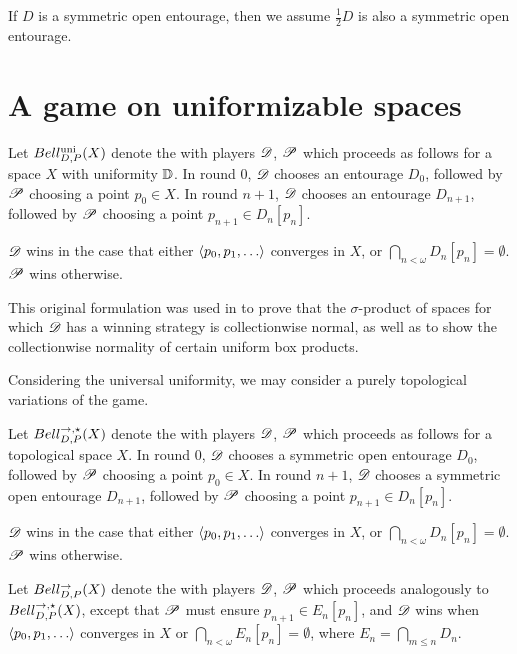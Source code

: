 If $D$ is a symmetric open entourage, then we assume $\frac{1}{2}D$ is
also a symmetric open entourage.

\section{A game on uniformizable spaces}

\begin{game}
  Let $Bell_{D,P}^{\textrm{uni}}(X)$ denote the  with players
  $\mathscr{D}$, $\mathscr{P}$ which
  proceeds as follows for a space $X$ with uniformity $\mathbb{D}$. In round $0$,
  $\mathscr{D}$ chooses an entourage $D_0$, followed by $\mathscr{P}$ choosing a point
  $p_0\in X$. In round $n+1$, $\mathscr{D}$ chooses an entourage $D_{n+1}$, followed
  by $\mathscr{P}$ choosing a point $p_{n+1}\in D_n[p_n]$.

  $\mathscr{D}$ wins in the case that either $\<p_0,p_1,\dots\>$ converges in $X$,
  or $\bigcap_{n<\omega}D_n[p_n] = \emptyset$. $\mathscr{P}$ wins otherwise.
\end{game}

This original formulation was used in \cite{MR3239205} to prove that the
$\sigma$-product of spaces for which $\mathscr{D}$ has a winning strategy is
collectionwise normal, as well as to show the collectionwise normality
of certain uniform box products.

Considering the universal uniformity, we may
consider a purely topological variations of the game.

\begin{game}
  Let $Bell_{D,P}^{\to,\star}(X)$ denote the  with players $\mathscr{D}$,
  $\mathscr{P}$ which proceeds as follows for a topological space $X$. In round $0$,
  $\mathscr{D}$ chooses a symmetric open entourage $D_0$, followed by $\mathscr{P}$
  choosing a point $p_0\in X$. In round $n+1$, $\mathscr{D}$ chooses a symmetric
  open entourage $D_{n+1}$, followed
  by $\mathscr{P}$ choosing a point $p_{n+1}\in D_n[p_n]$.

  $\mathscr{D}$ wins in the case that either $\<p_0,p_1,\dots\>$ converges in $X$,
  or $\bigcap_{n<\omega}D_n[p_n] = \emptyset$. $\mathscr{P}$ wins otherwise.
\end{game}

\begin{game}
  Let $Bell_{D,P}^{\to}(X)$ denote the  with players $\mathscr{D}$,
  $\mathscr{P}$ which proceeds analogously to $Bell_{D,P}^{\to,\star}(X)$, except that
  $\mathscr{P}$ must ensure $p_{n+1}\in E_n[p_n]$,
  and $\mathscr{D}$ wins when $\<p_0,p_1,\dots\>$ converges in $X$
  or $\bigcap_{n<\omega}E_n[p_n] = \emptyset$, where
  $E_n=\bigcap_{m\leq n}D_n$.
\end{game}


